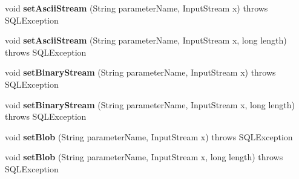 \begin{DoxyCompactItemize}
\mbox{\label{classcom_1_1mysql_1_1jdbc_1_1jdbc2_1_1optional_1_1_j_d_b_c4_callable_statement_wrapper_add8bd3492fa5b44f4b2c3b88c07d6a97}} 
void {\bfseries set\+Ascii\+Stream} (String parameter\+Name, Input\+Stream x)  throws S\+Q\+L\+Exception 
\item 
\mbox{\label{classcom_1_1mysql_1_1jdbc_1_1jdbc2_1_1optional_1_1_j_d_b_c4_callable_statement_wrapper_adb8fd5746fc1823c4a20b039bb08c36c}} 
void {\bfseries set\+Ascii\+Stream} (String parameter\+Name, Input\+Stream x, long length)  throws S\+Q\+L\+Exception 
\item 
\mbox{\label{classcom_1_1mysql_1_1jdbc_1_1jdbc2_1_1optional_1_1_j_d_b_c4_callable_statement_wrapper_a04a381ca072b0d3b9c35e1fc3f5c564e}} 
void {\bfseries set\+Binary\+Stream} (String parameter\+Name, Input\+Stream x)  throws S\+Q\+L\+Exception 
\item 
\mbox{\label{classcom_1_1mysql_1_1jdbc_1_1jdbc2_1_1optional_1_1_j_d_b_c4_callable_statement_wrapper_a1c045abf4862860aeb21a09ac191958d}} 
void {\bfseries set\+Binary\+Stream} (String parameter\+Name, Input\+Stream x, long length)  throws S\+Q\+L\+Exception 
\item 
\mbox{\label{classcom_1_1mysql_1_1jdbc_1_1jdbc2_1_1optional_1_1_j_d_b_c4_callable_statement_wrapper_a63ccc8b1f5b40aae556187aca9e09ced}} 
void {\bfseries set\+Blob} (String parameter\+Name, Input\+Stream x)  throws S\+Q\+L\+Exception 
\item 
\mbox{\label{classcom_1_1mysql_1_1jdbc_1_1jdbc2_1_1optional_1_1_j_d_b_c4_callable_statement_wrapper_a4f515bf4a872b66cf55fe249b8b3bbd3}} 
void {\bfseries set\+Blob} (String parameter\+Name, Input\+Stream x, long length)  throws S\+Q\+L\+Exception 
\item 
\mbox{\label{classcom_1_1mysql_1_1jdbc_1_1jdbc2_1_1optional_1_1_j_d_b_c4_callable_statement_wrapper_a4f5fe48596e046eee36d9e9422d56a37}} 

\end{DoxyCompactItemize}
